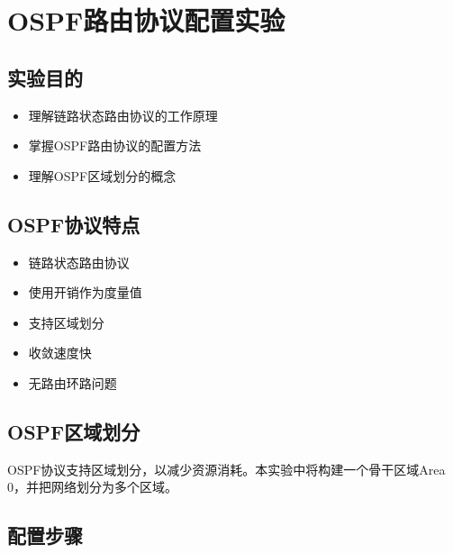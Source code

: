 \documentclass[12pt,a4paper]{ctexart}
\begin{document}
\section{OSPF路由协议配置实验}

\subsection{实验目的}

\begin{itemize}[leftmargin=2em,itemsep=0pt]
    \item 理解链路状态路由协议的工作原理
    \item 掌握OSPF路由协议的配置方法
    \item 理解OSPF区域划分的概念
\end{itemize}

\subsection{OSPF协议特点}

\begin{itemize}[leftmargin=2em,itemsep=0pt]
    \item 链路状态路由协议
    \item 使用开销作为度量值
    \item 支持区域划分
    \item 收敛速度快
    \item 无路由环路问题
\end{itemize}

\subsection{OSPF区域划分}

OSPF协议支持区域划分，以减少资源消耗。本实验中将构建一个骨干区域Area 0，并把网络划分为多个区域。

\subsection{配置步骤}
\end{document}
